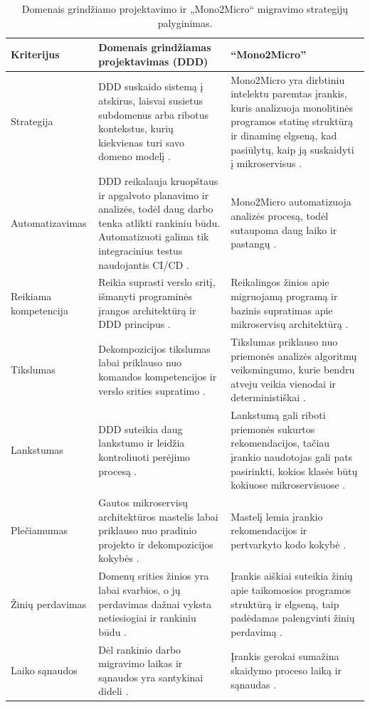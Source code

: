 \documentclass{VUMIFPSbakalaurinis}
\begin{document}
\begin{table}
\centering
\begin{tabularx}{\textwidth}{|l|X|X|}
\hline
\textbf{Kriterijus} & \textbf{Domenais grindžiamas projektavimas (DDD)} & \textbf{\enquote{Mono2Micro}} \\ 
\hline
Strategija & DDD suskaido sistemą į atskirus, laisvai susietus subdomenus arba ribotus kontekstus, kurių kiekvienas turi savo domeno modelį \cite{New19}. &  Mono2Micro yra dirbtiniu intelektu paremtas įrankis, kuris analizuoja monolitinės programos statinę struktūrą ir dinaminę elgseną, kad pasiūlytų, kaip ją suskaidyti į mikroservisus \cite{KXK+21}. \\
\hline
Automatizavimas & DDD reikalauja kruopštaus ir apgalvoto planavimo ir analizės, todėl daug darbo tenka atlikti rankiniu būdu. Automatizuoti galima tik integracinius testus naudojantis CI/CD \cite{FBZ+19}. & Mono2Micro automatizuoja analizės procesą, todėl sutaupoma daug laiko ir pastangų \cite{KXK+21}. \\
\hline
Reikiama kompetencija & Reikia suprasti verslo sritį, išmanyti programinės įrangos architektūrą ir DDD principus \cite{New19}. &  Reikalingos žinios apie migruojamą programą ir bazinis supratimas apie mikroservisų architektūrą \cite{IBMM2M}. \\
\hline
Tikslumas & Dekompozicijos tikslumas labai priklauso nuo komandos kompetencijos ir verslo srities supratimo \cite{Wal22}. & Tikslumas priklauso nuo priemonės analizės algoritmų veiksmingumo, kurie bendru atveju veikia vienodai ir deterministiškai \cite{KXK+21, KXL+20}. \\
\hline
Lankstumas & DDD suteikia daug lankstumo ir leidžia kontroliuoti perėjimo procesą \cite{Beh18}. & Lankstumą gali riboti priemonės sukurtos rekomendacijos, tačiau įrankio naudotojas gali pats pasirinkti, kokios klasės būtų kokiuose mikroservisuose \cite{IBMM2M}. \\
\hline
Plečiamumas & Gautos mikroservisų architektūros mastelis labai priklauso nuo pradinio projekto ir dekompozicijos kokybės \cite{New19}. & Mastelį lemia įrankio rekomendacijos ir pertvarkyto kodo kokybė \cite{KXL+20}. \\
\hline
Žinių perdavimas & Domenų srities žinios yra labai svarbios, o jų perdavimas dažnai vyksta netiesiogiai ir rankiniu būdu \cite{FBZ+19}. & Įrankis aiškiai suteikia žinių apie taikomosios programos struktūrą ir elgseną, taip padėdamas palengvinti žinių perdavimą \cite{IBMM2M}. \\
\hline
Laiko sąnaudos & Dėl rankinio darbo migravimo laikas ir sąnaudos yra santykinai dideli \cite{New19, Beh18}. & Įrankis gerokai sumažina skaidymo proceso laiką ir sąnaudas \cite{KXK+21, KXL+20, IBMM2M}. \\
\hline
\end{tabularx}
\caption{Domenais grindžiamo projektavimo ir „Mono2Micro“ migravimo strategijų palyginimas.}
\label{tab:comparison}
\end{table}
\end{document}
